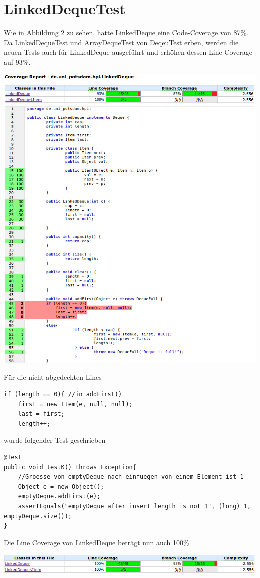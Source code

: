 \documentclass[a4paper,11pt]{scrartcl}
\begin{document}
\section{LinkedDequeTest}
Wie in Abbildung 2 zu sehen, hatte LinkedDeque eine Code-Coverage von 87\%. Da LinkedDequeTest und ArrayDequeTest von DeqeuTest erben, werden die neuen Tests auch für LinkedDeque ausgeführt und erhöhen dessen Line-Coverage auf 93\%.
\begin{center}
\includegraphics[scale=0.45]{linkeddeque}
\end{center}
Für die nicht abgedeckten Lines
\begin{lstlisting}
if (length == 0){ //in addFirst()
	first = new Item(e, null, null);
	last = first;
	length++;
\end{lstlisting}
wurde folgender Test geschrieben
\begin{lstlisting}
@Test 
public void testK() throws Exception{
    //Groesse von emptyDeque nach einfuegen von einem Element ist 1
	Object e = new Object();
    emptyDeque.addFirst(e);
    assertEquals("emptyDeque after insert length is not 1", (long) 1, emptyDeque.size());
}
\end{lstlisting}
Die Line Coverage von LinkedDeque beträgt nun auch 100\%
\begin{center}
\includegraphics[scale=0.5]{LinkedDeque100}
\end{center}
\end{document}
